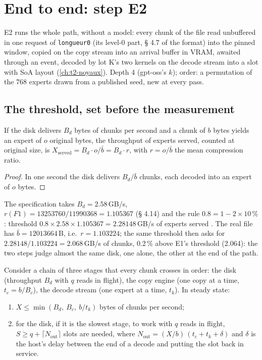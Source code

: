 \section{End to end: step E2}\label{sec:t2c-e2}

E2 runs the whole path, without a model: every chunk of the file read unbuffered in one request of \texttt{longueur0} (its level-0 part, § 4.7 of the format) into the pinned window, copied on the copy stream into an arrival buffer in VRAM, awaited through an event, decoded by lot K's two kernels on the decode stream into a slot with SoA layout (\cref{ch:t2-noyaux}). Depth 4 (gpt-oss's $k$); order: a permutation of the 768 experts drawn from a published seed, new at every pass.

\subsection{The threshold, set before the measurement}

\begin{proposition}\label{prop:t2c-seuil-e2}
If the disk delivers $B_d$ bytes of chunks per second and a chunk of $b$ bytes yields an expert of $o$ original bytes, the throughput of experts served, counted at original size, is $X_{\mathrm{served}} = B_d \cdot o / \bar b = B_d \cdot r$, with $r = o / \bar b$ the mean compression ratio.
\end{proposition}

\begin{proof}
In one second the disk delivers $B_d / \bar b$ chunks, each decoded into an expert of $o$ bytes.
\end{proof}

The specification takes $B_d = 2.58$\,GB/s, $r(F1) = \num{13253760} / \num{11990368} = 1.105367$ (§ 4.14) and the rule $0.8 = 1 - 2 \times 10\,\%$: threshold $0.8 \times 2.58 \times 1.105367 = \mathbf{2.28148}$\,GB/s of experts served \calc. The real file has $\bar b = \num{12013664}$\,B, i.e.\ $r = 1.103224$; the same threshold then asks for $2.28148 / 1.103224 = 2.068$\,GB/s of chunks, 0.2\,\% above E1's threshold (2.064): the two steps judge almost the same disk, one alone, the other at the end of the path.

\begin{theoreme}\label{thm:t2c-chaine}
Consider a chain of three stages that every chunk crosses in order: the disk (throughput $B_d$ with $q$ reads in flight), the copy engine (one copy at a time, $t_c = b/B_c$), the decode stream (one expert at a time, $t_k$). In steady state:
\begin{enumerate}
\item $X \le \min(B_d,\ B_c,\ b/t_k)$ bytes of chunks per second;
\item for the disk, if it is the slowest stage, to work with $q$ reads in flight, $S \ge q + \lceil N_{\mathrm{out}} \rceil$ slots are needed, where $N_{\mathrm{out}} = (X/b)\,(t_c + t_k + \delta)$ and $\delta$ is the host's delay between the end of a decode and putting the slot back in service.
\end{enumerate}
\end{theoreme}

